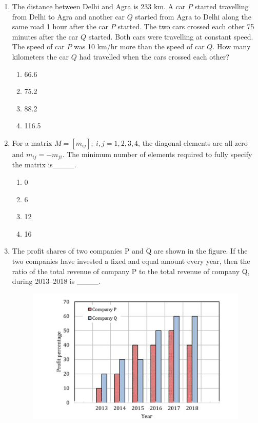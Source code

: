 \documentclass[journal,12pt,onecolumn]{IEEEtran}
\begin{document}
\begin{enumerate}[label=\arabic*.]
\item The distance between Delhi and Agra is 233 km. A car $P$ started travelling from Delhi to Agra and another car $Q$ started from Agra to Delhi along the same road 1 hour after the car $P$ started. The two cars crossed each other 75 minutes after the car $Q$ started. Both cars were travelling at constant speed. The speed of car $P$ was 10 km/hr more than the speed of car $Q$. How many kilometers the car $Q$ had travelled when the cars crossed each other?
\begin{multicols}{2}
\begin{enumerate}[label=(\Alph*)]
    \item 66.6
    \item 75.2
    \item 88.2
    \item 116.5
\end{enumerate}
\end{multicols}

\item For a matrix $M = [m_{ij}];~i,j=1,2,3,4$, the diagonal elements are all zero and $m_{ij} = -m_{ji}$. The minimum number of elements required to fully specify the matrix is\_\_\_\_.
\begin{multicols}{2}
\begin{enumerate}[label=(\Alph*)]
    \item 0
    \item 6
    \item 12
    \item 16
\end{enumerate}
\end{multicols}
\item The profit shares of two companies P and Q are shown in the figure. If the two companies have invested a fixed and equal amount every year, then the ratio of the total revenue of company P to the total revenue of company Q, during 2013--2018 is \_\_\_\_.

\begin{figure}[H]
\centering
\includegraphics[width=0.7\columnwidth]{FIG/GA-10.png}
\caption*{}
\label{GA-10}
\end{figure}


\end{enumerate}
\end{document}
